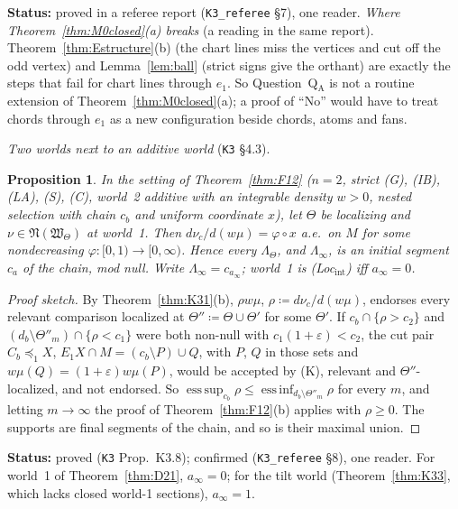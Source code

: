 \documentclass[11pt]{article}
\newtheorem{proposition}[theorem]{Proposition}
\theoremstyle{definition}
\theoremstyle{remark}
\newcommand{\src}[1]{\texttt{#1}}
\newcommand{\status}[1]{\par\smallskip\noindent\textbf{Status:} #1\par\smallskip}
\begin{document}
\status{proved in a referee report (\src{K3\_referee} \S7), one reader. \emph{Where Theorem~\ref{thm:M0closed}(a) breaks} (a reading in the same report). Theorem~\ref{thm:Estructure}(b) (the chart lines miss the vertices and cut off the odd vertex) and Lemma~\ref{lem:ball} (strict signs give the orthant) are exactly the steps that fail for chart lines through $e_1$. So Question~Q$_{\mathrm A}$ is not a routine extension of Theorem~\ref{thm:M0closed}(a); a proof of ``No'' would have to treat chords through $e_1$ as a new configuration beside chords, atoms and fans.}

\emph{Two worlds next to an additive world} (\src{K3} \S4.3).

\begin{proposition}\label{prop:K38}
In the setting of Theorem~\ref{thm:F12} ($n=2$, strict (G), (IB), (LA), (S), (C), world~2 additive with an integrable density $w>0$, nested selection with chain $c_b$ and uniform coordinate $x$), let $\Theta$ be localizing and $\nu\in\mathfrak N(\mathfrak W_\Theta)$ at world~1. Then $d\nu_c/d(w\mu)=\varphi\circ x$ a.e.\ on $M$ for some nondecreasing $\varphi:[0,1)\to[0,\infty)$. Hence every $\Lambda_\Theta$, and $\Lambda_\infty$, is an initial segment $c_a$ of the chain, mod null. Write $\Lambda_\infty=c_{a_\infty}$; world~1 is (Loc$_{\mathrm{int}}$) iff $a_\infty=0$.
\end{proposition}
\begin{proof}[Proof sketch]
By Theorem~\ref{thm:K31}(b), $\rho w\mu$, $\rho\coloneqq d\nu_c/d(w\mu)$, endorses every relevant comparison localized at $\Theta''\coloneqq\Theta\cup\Theta'$ for some $\Theta'$. If $c_b\cap\{\rho>c_2\}$ and $(d_b\setminus\Theta''_m)\cap\{\rho<c_1\}$ were both non-null with $c_1(1+\varepsilon)<c_2$, the cut pair $C_b\preceq_1X$, $E_1X\cap M=(c_b\setminus P)\cup Q$, with $P$, $Q$ in those sets and $w\mu(Q)=(1+\varepsilon)w\mu(P)$, would be accepted by (K), relevant and $\Theta''$-localized, and not endorsed. So $\operatorname{ess\,sup}_{c_b}\rho\le\operatorname{ess\,inf}_{d_b\setminus\Theta''_m}\rho$ for every $m$, and letting $m\to\infty$ the proof of Theorem~\ref{thm:F12}(b) applies with $\rho\ge0$. The supports are final segments of the chain, and so is their maximal union.
\end{proof}
\status{proved (\src{K3} Prop.~K3.8); confirmed (\src{K3\_referee} \S8), one reader. For world~1 of Theorem~\ref{thm:D21}, $a_\infty=0$; for the tilt world (Theorem~\ref{thm:K33}, which lacks closed world-1 sections), $a_\infty=1$.}
\end{document}
